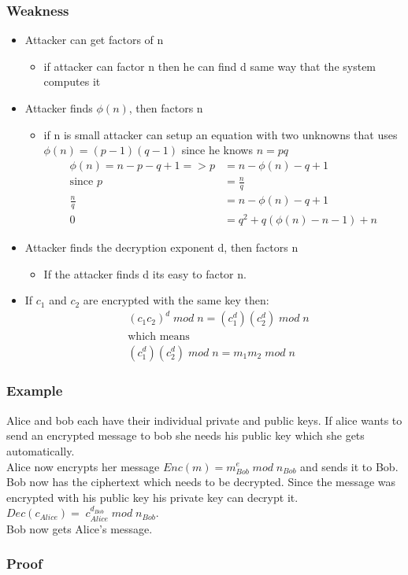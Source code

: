 \subsubsection{Weakness}
\begin{itemize}
\item Attacker can get factors of n
\begin{itemize}
\item if attacker can factor n then he can find d same way that the system computes it
\end{itemize}
\item Attacker finds $\phi (n)$, then factors n
\begin{itemize}
\item if n is small attacker can setup an equation with two unknowns that uses $\phi (n)=(p-1)(q-1)$ since he knows $n=pq$
\begin{align*}
\phi (n)=n-p-q+1=>p&=n-\phi (n)-q+1\\
\mbox{since } p&=\frac{n}{q}\\
\frac{n}{q}&=n-\phi (n)-q+1\\
0&=q^2+q(\phi (n)-n-1)+n
\end{align*}
\end{itemize}
\item Attacker finds the decryption exponent d, then factors n
\begin{itemize}
\item If the attacker finds d its easy to factor n.
\end{itemize}
\item If $c_1$ and $c_2$ are encrypted with the same key then:
\begin{align*}
&(c_1c_2)^d\; mod\; n = (c_1^d) (c_2^d)\; mod \;n\\
&\mbox{which means}\\
&(c_1^d) (c_2^d)\; mod \;n = m_1m_2\;mod \; n
\end{align*}



\end{itemize}
\subsubsection{Example}
Alice and bob each have their individual private and public keys.
If alice wants to send an encrypted message to bob she needs his public key which she gets automatically.\\
Alice now encrypts her message $Enc(m)=m^e_{Bob}\;mod\;n_{Bob}$ and sends it to Bob. \\
Bob now has the ciphertext which needs to be decrypted. Since the message was encrypted with his public key his private key can decrypt it. $Dec(c_{Alice})=\;c^{d_{Bob}}_{Alice}\;mod\;n_{Bob}$.\\
Bob now gets Alice’s message.

\subsubsection{Proof}

